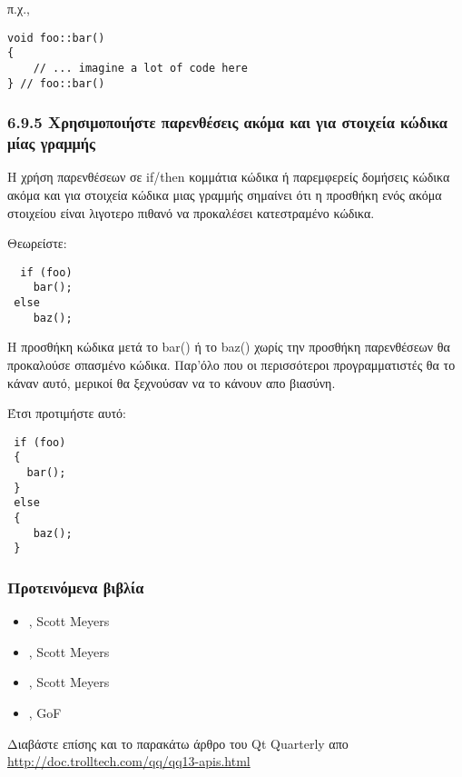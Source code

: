 π.χ.,

\begin{verbatim}
void foo::bar()
{ 
    // ... imagine a lot of code here 
} // foo::bar()
\end{verbatim}

\hypertarget{toc27}{}
\subsubsection{6.9.5 Χρησιμοποιήστε παρενθέσεις ακόμα και για στοιχεία κώδικα μίας γραμμής}
Η χρήση παρενθέσεων σε if/then κομμάτια κώδικα ή παρεμφερείς δομήσεις κώδικα ακόμα και για στοιχεία κώδικα μιας γραμμής σημαίνει ότι η προσθήκη ενός ακόμα στοιχείου είναι λιγοτερο πιθανό να προκαλέσει κατεστραμένο κώδικα.

Θεωρείστε:

\begin{verbatim}
  if (foo)
    bar();
 else
    baz();
\end{verbatim}

Η προσθήκη κώδικα μετά το bar() ή το baz() χωρίς την προσθήκη παρενθέσεων θα προκαλούσε σπασμένο κώδικα. Παρ'όλο που οι περισσότεροι προγραμματιστές θα το κάναν αυτό, μερικοί θα ξεχνούσαν να το κάνουν απο βιασύνη.

Έτσι προτιμήστε αυτό:

\begin{verbatim}
 if (foo)
 {
   bar();
 }
 else
 { 
    baz();
 } 
\end{verbatim}

\hypertarget{toc28}{}
\subsubsection{Προτεινόμενα βιβλία}
\begin{itemize}
\item {}, Scott Meyers
\item {}, Scott Meyers
\item {}, Scott Meyers
\item {}, GoF
\end{itemize}


Διαβάστε επίσης και το παρακάτω άρθρο του Qt Quarterly απο \\
\url{http://doc.trolltech.com/qq/qq13-apis.html}


